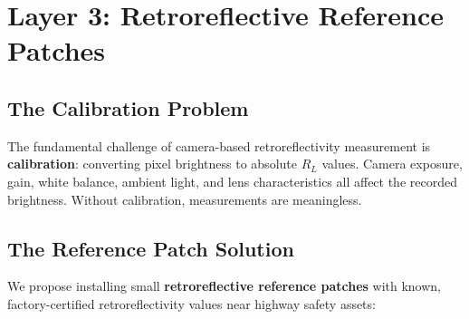 \documentclass[11pt,a4paper]{article}
\begin{document}
\section{Layer 3: Retroreflective Reference Patches}
\label{sec:layer3}

\subsection{The Calibration Problem}

The fundamental challenge of camera-based retroreflectivity measurement is \textbf{calibration}: converting pixel brightness to absolute $R_L$ values. Camera exposure, gain, white balance, ambient light, and lens characteristics all affect the recorded brightness. Without calibration, measurements are meaningless.

\subsection{The Reference Patch Solution}

We propose installing small \textbf{retroreflective reference patches} with known, factory-certified retroreflectivity values near highway safety assets:
\end{document}
